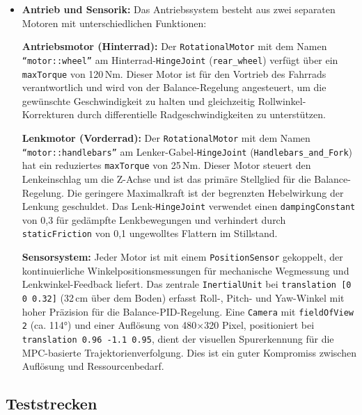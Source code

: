 \begin{itemize}
    \item \textbf{Antrieb und Sensorik:} Das Antriebssystem besteht aus zwei separaten Motoren mit unterschiedlichen Funktionen:
    
    \textbf{Antriebsmotor (Hinterrad):} Der \texttt{RotationalMotor} mit dem Namen \texttt{``motor::wheel''} am Hinterrad-\texttt{HingeJoint} 
    (\texttt{rear\_wheel}) verfügt über ein \texttt{maxTorque} von 120\,Nm. Dieser Motor ist für den Vortrieb des Fahrrads verantwortlich 
    und wird von der Balance-Regelung angesteuert, um die gewünschte Geschwindigkeit zu halten und gleichzeitig Rollwinkel-Korrekturen 
    durch differentielle Radgeschwindigkeiten zu unterstützen.
    
    \textbf{Lenkmotor (Vorderrad):} Der \texttt{RotationalMotor} mit dem Namen \texttt{``motor::handlebars''} am Lenker-Gabel-\texttt{HingeJoint} 
    (\texttt{Handlebars\_and\_Fork}) hat ein reduziertes \texttt{maxTorque} von 25\,Nm. Dieser Motor steuert den Lenkeinschlag um die 
    Z-Achse und ist das primäre Stellglied für die Balance-Regelung. Die geringere Maximalkraft ist der begrenzten 
    Hebelwirkung der Lenkung geschuldet. Das Lenk-\texttt{HingeJoint} verwendet einen \texttt{dampingConstant} von 0{,}3 für gedämpfte 
    Lenkbewegungen und verhindert durch \texttt{staticFriction} von 0{,}1 ungewolltes Flattern im Stillstand.

    \textbf{Sensorsystem:} Jeder Motor ist mit einem \texttt{PositionSensor} gekoppelt,
    der kontinuierliche Winkelpositionsmessungen für mechanische Wegmessung und Lenkwinkel-Feedback liefert. Das zentrale \texttt{InertialUnit} bei 
    \texttt{translation [0 0 0.32]} (32\,cm über dem Boden) erfasst Roll-, Pitch- und Yaw-Winkel mit hoher Präzision für die Balance-PID-Regelung. 
    Eine \texttt{Camera} mit \texttt{fieldOfView 2} (ca. 114°) und einer Auflösung von 480$\times$320 Pixel, positioniert bei \texttt{translation 0.96 -1.1 0.95}, 
    dient der visuellen Spurerkennung für die MPC-basierte Trajektorienverfolgung. Dies ist ein guter Kompromiss zwischen 
    Auflösung und Ressourcenbedarf.
  \end{itemize}

  





\subsection{Teststrecken} \label{chap:teststrecken}
  
